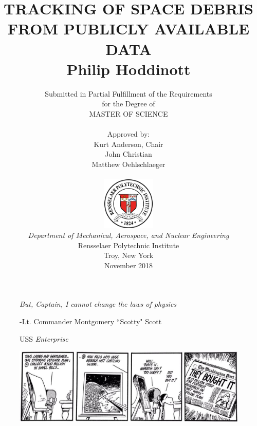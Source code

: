 \documentclass[12pt]{article}
\title{ 
		\LARGE \textbf{\uppercase{Tracking of space debris from publicly available data }} \\
		\vspace{0.25cm}
		\LARGE \textbf{Philip Hoddinott}
	}
\author{\small{Submitted in Partial Fulfillment of the Requirements} \\ \small{for the Degree of} \\
		\uppercase{Master of Science} \\ \\
		Approved by:
		\\ Kurt Anderson, Chair \\ John Christian \\ Matthew Oehlschlaeger \\ \\ %
		\includegraphics[width=2.5cm]{rensselaer_seal.png} \\
		\small{\textit{Department of Mechanical, Aerospace, and Nuclear Engineering}} \\
		\small{Rensselaer Polytechnic Institute} \\ 
		\small{Troy, New York} \\
		\small{November 2018}
	}
\begin{document}
	\maketitle
	
	
	\setcounter{page}{-1}

	\newlength\longest
	\clearpage
	
	\thispagestyle{empty}
	\null\vfill
	
	\begin{figure}[!t]
		\begin{center}
			\settowidth{}
			\parbox{\longest}{%
				\raggedright{\huge\itshape%
					But, Captain, I cannot change the laws of physics\par\bigskip
				}   
				\raggedleft\Large{-Lt. Commander Montgomery ``Scotty" Scott}\par
				\raggedleft\Large{USS}\textit{ Enterprise}\par%
				
			}
		\end{center}
	\end{figure}

	
	\null\vfill
	
	
	\begin{figure}
		\centering
		\includegraphics[width=0.7\linewidth]{../../Bloom_County}
		\caption*{}
		\label{fig:bloomcounty}
	\end{figure}
	
	\newpage
	\tableofcontents
	\newpage

	
	\listoftables
	\listoffigures
	
\end{document}
